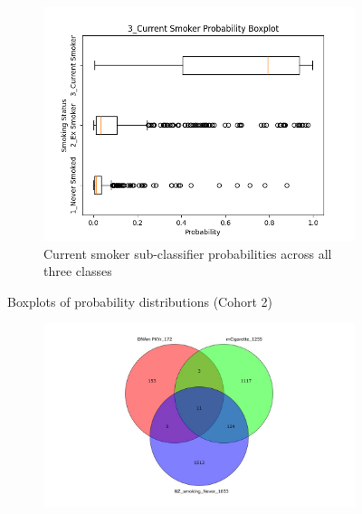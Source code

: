 \documentclass{article}
\begin{document}
\begin{figure}
    \begin{subfigure}{0.48\textwidth}
        \centering
        \includegraphics[width=\linewidth]{cohort2_3_boxplot.png}
        \caption{Current smoker sub-classifier probabilities across all three classes}
    \end{subfigure}
    \caption{Boxplots of probability distributions (Cohort 2)}
\end{figure}


\begin{figure}
    \centering
    \begin{subfigure}{\textwidth}
        \centering
        \includegraphics[width=\linewidth]{Venn_NZnever.jpg}
    \end{subfigure}
\end{figure}
\end{document}
